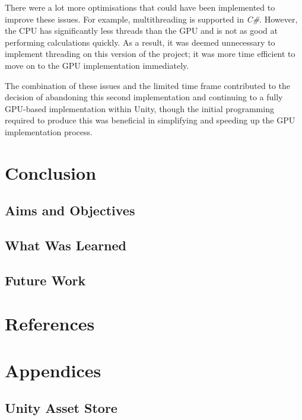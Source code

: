 \documentclass[12pt]{article}
\begin{document}
    There were a lot more optimisations that could have been implemented to improve these issues. For example, multithreading is supported in \textit{C\#}. However, the CPU has significantly less threads than the GPU and is not as good at performing calculations quickly. As a result, it was deemed unnecessary to implement threading on this version of the project; it was more time efficient to move on to the GPU implementation immediately.

    The combination of these issues and the limited time frame contributed to the decision of abandoning this second implementation and continuing to a fully GPU-based implementation within Unity, though the initial programming required to produce this was beneficial in simplifying and speeding up the GPU implementation process.

    \newpage

    \section{Conclusion}
    \label{sec:conclusion}
    \subsection{Aims and Objectives}
    \subsection{What Was Learned}
    \subsection{Future Work}

    \newpage

    \section{References}
    \label{sec:references}
    

    \newpage

    \section{Appendices}
    \label{sec:appendices}

    \subsection{Unity Asset Store}
\end{document}
